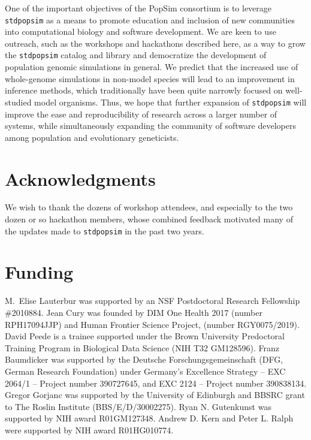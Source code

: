 \documentclass[hidelinks]{article}
\newcommand{\stdpopsim}{\texttt{stdpopsim}\xspace}
\begin{document}
One of the important objectives of the PopSim consortium is to leverage \stdpopsim as a means to promote education and inclusion of new communities into
computational biology and software development.
We are keen to use outreach, such as the workshops and hackathons described here, 
as a way to grow the \stdpopsim catalog and library and
democratize the development of population genomic simulations in general.
We predict that the increased use of whole-genome simulations in non-model species will lead to an improvement in inference methods,
which traditionally have been quite narrowly focused on well-studied model organisms.
Thus, we hope that further expansion of \stdpopsim will improve the ease and reproducibility of research across a larger number of systems,
while simultaneously expanding the community of software developers among population and evolutionary geneticists.


\section*{Acknowledgments}\label{acknowledgements}

We wish to thank the dozens of workshop attendees,
and especially to the two dozen or so hackathon members,
whose combined feedback motivated many of the updates made to \stdpopsim in the past two years.

\section*{Funding}
    \label{funding}

M.~Elise Lauterbur was supported by an NSF Postdoctoral Research Fellowship \#2010884.
Jean Cury was founded by DIM One Health 2017 (number RPH17094JJP) and Human Frontier Science Project, (number RGY0075/2019).
David Peede is a trainee supported under the Brown University Predoctoral Training Program in Biological Data Science (NIH T32 GM128596).
Franz Baumdicker was supported by the Deutsche Forschungsgemeinschaft (DFG, German Research Foundation) under Germany’s Excellence Strategy – EXC 2064/1 – Project number 390727645, and EXC 2124 – Project number 390838134.
Gregor Gorjanc was supported by the University of Edinburgh and BBSRC grant to The Roslin Institute (BBS/E/D/30002275).
Ryan N. Gutenkunst was supported by NIH award R01GM127348.
Andrew D. Kern and Peter L. Ralph were supported by NIH award R01HG010774.


\end{document}
